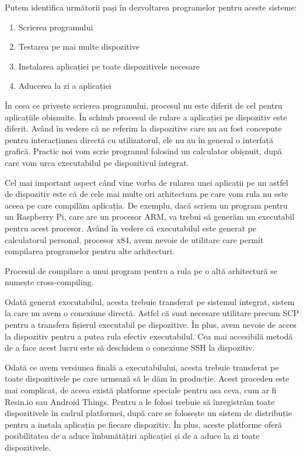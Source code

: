 Putem identifica următorii pași în dezvoltarea programelor pentru aceste
sisteme:

\begin{enumerate}
	\item Scrierea programului
	\item Testarea pe mai multe dispozitive
	\item Instalarea aplicației pe toate dispozitivele necesare
	\item Aducerea la zi a aplicației
\end{enumerate}

În ceea ce privește scrierea programului, procesul nu este diferit de cel pentru
aplicațiile obișnuite. În schimb procesul de rulare a aplicației pe dispozitiv
este diferit. Având în vedere că ne referim la dispozitive care nu au fost
concepute pentru interacțiunea directă cu utilizatorul, ele nu au în general o
interfață grafică. Practic noi vom scrie programul folosind un calculator
obișnuit, după care vom urca executabilul pe dispozitivul integrat.

Cel mai important aspect când vine vorba de rularea unei aplicații pe un astfel
de dispozitiv este că de cele mai multe ori arhitectura pe care vom rula nu este
aceea pe care compilăm aplicația. De exemplu, dacă scriem un program pentru un
Raspberry Pi, care are un procesor ARM, va trebui să generăm un executabil
pentru acest procesor. Având în vedere că executabilul este generat pe
calculatorul personal, procesor x84, avem nevoie de utilitare care permit
compilarea programelor pentru alte arhitecturi.

Procesul de compilare a unui program pentru a rula pe o altă arhitectură se
numește cross-compiling.

Odată generat executabilul, acesta trebuie transferat pe sistemul integrat,
sistem la care nu avem o conexiune directă. Astfel că sunt necesare utilitare
precum SCP pentru a transfera fișierul executabil pe dispozitive. În plus, avem
nevoie de acces la dispozitiv pentru a putea rula efectiv executabilul. Cea mai
accesibilă metodă de a face acest lucru este să deschidem o conexiune SSH la
dispozitiv.

Odată ce avem versiunea finală a executabilului, acesta trebuie transferat pe
toate dispozitivele pe care urmează să le dăm în producție. Acest procedeu este
mai complicat, de aceea există platforme speciale pentru asa ceva, cum ar fi
Resin.io sau Android Things. Pentru a le folosi trebuie să înregistrăm toate
dispozitivele în cadrul platformei, după care se folosește un sistem de
distribuție pentru a instala aplicația pe fiecare dispozitiv. În plus, aceste
platforme oferă posibilitatea de a aduce îmbunătățiri aplicației și de a aduce
la zi toate dispozitivele.

